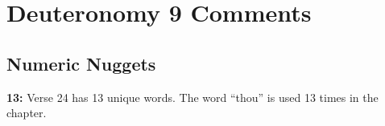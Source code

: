 \section{Deuteronomy 9 Comments}

\subsection{Numeric Nuggets}

\textbf{13: } Verse 24 has 13 unique words. The word ``thou'' is used 13 times in the chapter. 